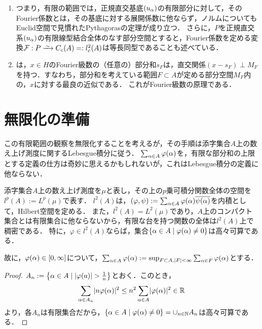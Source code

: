 \documentclass[uplatex,dvipdfmx]{jsreport}
\begin{document}
\begin{remarks}[Fourier級数の動作原理]\mbox{}
    \begin{enumerate}
        \item つまり，有限の範囲では，正規直交基底$(u_\alpha)$の有限部分に対して，そのFourier係数とは，その基底に対する展開係数に他ならず，ノルムについてもEuclid空間で見慣れたPythagorasの定理が成り立つ．
        さらに，$P$を正規直交系$(u_\alpha)$の有限線型結合全体のなす部分空間とすると，Fourier係数を定める変換$\F:P\iso C_c(A)=:l^2_c(A)$は等長同型であることも述べている．
        \item は，$x\in H$のFourier級数の（任意の）部分和$s_F$は，直交関係$(x-s_F)\perp M_F$を持つ．すなわち，部分和を考えている範囲$F\subset A$が定める部分空間$M_F$内の，$x$に対する最良の近似である．
        これがFourier級数の原理である．
    \end{enumerate}
\end{remarks}

\section{無限化の準備}

\begin{tcolorbox}[colframe=ForestGreen, colback=ForestGreen!10!white,breakable,colbacktitle=ForestGreen!40!white,coltitle=black,fonttitle=\bfseries\sffamily,
title=]
    この有限範囲の観察を無限化することを考えるが，その手順は添字集合$A$上の数え上げ測度に関するLebesgue積分に従う．
    $\sum_{\alpha\in A}\varphi(\alpha)$を，有限な部分和の上限とする定義の仕方は奇妙に思えるかもしれないが，これはLebesgue積分の定義に他ならない．
\end{tcolorbox}

\begin{definition}[無限和の定義]\label{def-infinite-sum}
    添字集合$A$上の数え上げ測度を$\mu$と表し，その上の$p$乗可積分関数全体の空間を$l^p(A):=L^p(\mu)$で表す．
    $l^2(A)$は，$(\varphi,\psi):=\sum_{\alpha\in A}\varphi(\alpha)\overline{\psi(\alpha)}$を内積として，Hilbert空間を定める．
    また，$l^2(A)=L^2(\mu)$であり，$A$上のコンパクト集合とは有限集合に他ならないから，有限な台を持つ関数の全体は$l^2(A)$上で稠密である．
    特に，$\varphi\in l^2(A)$ならば，集合$\left\{\alpha\in A\mid \varphi(\alpha)\ne0\right\}$は高々可算である．

    故に，$\varphi(\alpha)\in[0,\infty]$について，$\sum_{\alpha\in A}\varphi(\alpha):=\sup_{F\subset A,\lvert F\rvert<\infty}\sum_{\alpha\in F}\varphi(\alpha)$とする．
\end{definition}
\begin{proof}
    $A_n:=\left\{\alpha\in A\mid\lvert\varphi(a)\rvert>\frac{1}{n}\right\}$とおく．このとき，
    \[\sum_{\alpha\in A_n}\lvert n\varphi(\alpha)\rvert^2\le n^2\sum_{\alpha\in A}\lvert\varphi(\alpha)\rvert^2\in\mathbb{R}\]
    より，各$A_n$は有限集合だから，$\left\{\alpha\in A\mid \varphi(\alpha)\ne0\right\}=\cup_{n\in\mathbb{N}}A_n$は高々可算である．
\end{proof}
\end{document}
